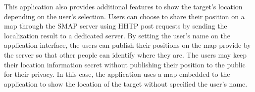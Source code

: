 This application also provides additional features to show the target’s location depending on the user’s selection. Users can choose to share their position on a map through the SMAP server using HHTP post requests by sending the localization result to a dedicated server. By setting the user’s name on the application interface, the users can publish their positions on the map provide by the server so that other people can identify where they are. The users may keep their location information secret without publishing their position to the public for their privacy. In this case, the application uses a map embedded to the application to show the location of the target without specified the user’s name. 




